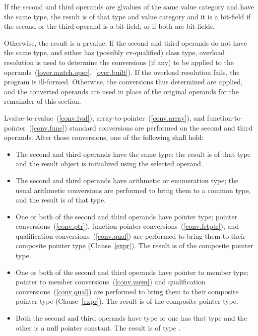 \pnum
If the second and third operands are glvalues of the same value category
and have the same type, the
result is of that type and value category and it is a bit-field if the
second or the third operand is a bit-field, or if both are bit-fields.

\pnum
Otherwise, the result is a prvalue. If the second and third operands do
not have the same type, and either has (possibly cv-qualified) class
type, overload resolution is used to determine the conversions (if any)
to be applied to the operands~(\ref{over.match.oper},~\ref{over.built}).
If the overload resolution fails, the program is ill-formed. Otherwise,
the conversions thus determined are applied, and the converted operands
are used in place of the original operands for the remainder of this
section.

\pnum
Lvalue-to-rvalue~(\ref{conv.lval}), array-to-pointer~(\ref{conv.array}),
and function-to-pointer~(\ref{conv.func}) standard conversions are
performed on the second and third operands. After those conversions, one
of the following shall hold:

\begin{itemize}
\item The second and third operands have the same type; the result is of
that type and the result object is initialized using the selected operand.

\item The second and third operands have arithmetic or enumeration type;
the usual arithmetic conversions are performed to bring them to a common
type, and the result is of that type.

\item One or both of the second and third operands have pointer type;
pointer conversions~(\ref{conv.ptr}),
function pointer conversions~(\ref{conv.fctptr}), and
qualification conversions~(\ref{conv.qual})
are performed to bring them to their
composite pointer type (Clause~\ref{expr}). The result is of the composite
pointer type.

\item One or both of the second and third operands have pointer to member type;
pointer to member conversions~(\ref{conv.mem}) and qualification
conversions~(\ref{conv.qual}) are performed to bring them to their composite
pointer type (Clause~\ref{expr}). The result is of the composite pointer type.

\item
Both the second and third operands have type  or one has
that type and the other is a null pointer constant. The result is of type
.

\end{itemize}

